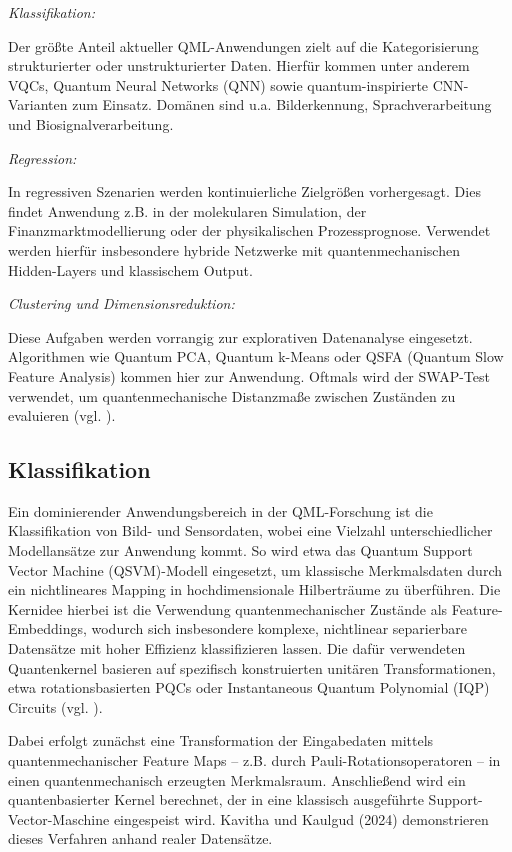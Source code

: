 \textit{Klassifikation:} 

Der größte Anteil aktueller QML-Anwendungen zielt auf die Kategorisierung strukturierter oder unstrukturierter Daten. Hierfür kommen unter anderem VQCs, Quantum Neural Networks (QNN) sowie quantum-inspirierte CNN-Varianten zum Einsatz. Domänen sind u.a. Bilderkennung, Sprachverarbeitung und Biosignalverarbeitung.
\vspace{0.3cm}

\textit{Regression:} 

In regressiven Szenarien werden kontinuierliche Zielgrößen vorhergesagt. Dies findet Anwendung z.B. in der molekularen Simulation, der Finanzmarktmodellierung oder der physikalischen Prozessprognose. Verwendet werden hierfür insbesondere hybride Netzwerke mit quantenmechanischen Hidden-Layers und klassischem Output.
\vspace{0.3cm}

\textit{Clustering und Dimensionsreduktion:}

Diese Aufgaben werden vorrangig zur explorativen Datenanalyse eingesetzt. Algorithmen wie Quantum PCA, Quantum k-Means oder QSFA (Quantum Slow Feature Analysis) kommen hier zur Anwendung. Oftmals wird der SWAP-Test verwendet, um quantenmechanische Distanzmaße zwischen Zuständen zu evaluieren (vgl. \cite{chengNoisyIntermediatescaleQuantum2023}).

\subsection{Klassifikation}
Ein dominierender Anwendungsbereich in der QML-Forschung ist die Klassifikation von Bild- und Sensordaten, wobei eine Vielzahl unterschiedlicher Modellansätze zur Anwendung kommt. So wird etwa das Quantum Support Vector Machine (QSVM)-Modell eingesetzt, um klassische Merkmalsdaten durch ein nichtlineares Mapping in hochdimensionale Hilberträume zu überführen. Die Kernidee hierbei ist die Verwendung quantenmechanischer Zustände als Feature-Embeddings, wodurch sich insbesondere komplexe, nichtlinear separierbare Datensätze mit hoher Effizienz klassifizieren lassen. Die dafür verwendeten Quantenkernel basieren auf spezifisch konstruierten unitären Transformationen, etwa rotationsbasierten PQCs oder Instantaneous Quantum Polynomial (IQP) Circuits (vgl. \cite{peral-garciaSystematicLiteratureReview2024}).

Dabei erfolgt zunächst eine Transformation der Eingabedaten mittels quantenmechanischer Feature Maps – z.B. durch Pauli-Rotationsoperatoren – in einen quantenmechanisch erzeugten Merkmalsraum. Anschließend wird ein quantenbasierter Kernel berechnet, der in eine klassisch ausgeführte Support-Vector-Maschine eingespeist wird. Kavitha und Kaulgud (2024) demonstrieren dieses Verfahren anhand realer Datensätze.


